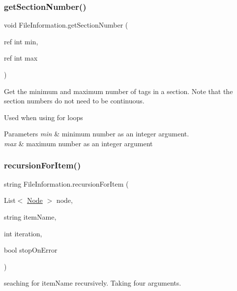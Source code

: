 \subsubsection{\texorpdfstring{getSectionNumber()}{getSectionNumber()}}
{\footnotesize\ttfamily void File\+Information.\+get\+Section\+Number (\begin{DoxyParamCaption}\item[{ref int}]{min,  }\item[{ref int}]{max }\end{DoxyParamCaption})\hspace{0.3cm}{\ttfamily [inline]}}



Get the minimum and maximum number of tags in a section. Note that the section numbers do not need to be continuous. 

Used when using \textquotesingle{}for\textquotesingle{} loops 
\begin{DoxyParams}{Parameters}
{\em min} & minimum number as an integer argument. \\
\hline
{\em max} & maximum number as an integer argument \\
\hline
\end{DoxyParams}
\mbox{\label{class_file_information_a130927de30209803fd7e1c2ab7c84b69}} 
\subsubsection{\texorpdfstring{recursionForItem()}{recursionForItem()}}
{\footnotesize\ttfamily string File\+Information.\+recursion\+For\+Item (\begin{DoxyParamCaption}\item[{List$<$ \mbox{\hyperlink{class_animal_change_1_1_node}{Node}} $>$}]{node,  }\item[{string}]{item\+Name,  }\item[{int}]{iteration,  }\item[{bool}]{stop\+On\+Error }\end{DoxyParamCaption})\hspace{0.3cm}{\ttfamily [inline]}}



seaching for item\+Name recursively. Taking four arguments. 


